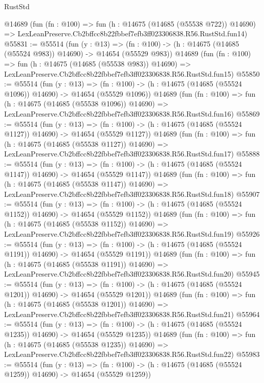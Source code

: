 \begin{lexlean}{RustStd}
\begin{coremodule}
    @14689
    (fun (fn : @100) =>
    fun (h : @14675 (@14685 (@55538 @722)) @14690) =>
    LexLeanPreserve.Cb2bffcc8b22fbbef7efb3ff023306838.R56.RustStd.fun14)
@55831 := @55514
    (fun (y : @13) =>
    (fn : @100) -> (h : @14675 (@14685 (@55524 @983)) @14690) -> @14654 (@55529 @983))
    @14689
    (fun (fn : @100) =>
    fun (h : @14675 (@14685 (@55538 @983)) @14690) =>
    LexLeanPreserve.Cb2bffcc8b22fbbef7efb3ff023306838.R56.RustStd.fun15)
@55850 := @55514
    (fun (y : @13) =>
    (fn : @100) -> (h : @14675 (@14685 (@55524 @1096)) @14690) -> @14654 (@55529 @1096))
    @14689
    (fun (fn : @100) =>
    fun (h : @14675 (@14685 (@55538 @1096)) @14690) =>
    LexLeanPreserve.Cb2bffcc8b22fbbef7efb3ff023306838.R56.RustStd.fun16)
@55869 := @55514
    (fun (y : @13) =>
    (fn : @100) -> (h : @14675 (@14685 (@55524 @1127)) @14690) -> @14654 (@55529 @1127))
    @14689
    (fun (fn : @100) =>
    fun (h : @14675 (@14685 (@55538 @1127)) @14690) =>
    LexLeanPreserve.Cb2bffcc8b22fbbef7efb3ff023306838.R56.RustStd.fun17)
@55888 := @55514
    (fun (y : @13) =>
    (fn : @100) -> (h : @14675 (@14685 (@55524 @1147)) @14690) -> @14654 (@55529 @1147))
    @14689
    (fun (fn : @100) =>
    fun (h : @14675 (@14685 (@55538 @1147)) @14690) =>
    LexLeanPreserve.Cb2bffcc8b22fbbef7efb3ff023306838.R56.RustStd.fun18)
@55907 := @55514
    (fun (y : @13) =>
    (fn : @100) -> (h : @14675 (@14685 (@55524 @1152)) @14690) -> @14654 (@55529 @1152))
    @14689
    (fun (fn : @100) =>
    fun (h : @14675 (@14685 (@55538 @1152)) @14690) =>
    LexLeanPreserve.Cb2bffcc8b22fbbef7efb3ff023306838.R56.RustStd.fun19)
@55926 := @55514
    (fun (y : @13) =>
    (fn : @100) -> (h : @14675 (@14685 (@55524 @1191)) @14690) -> @14654 (@55529 @1191))
    @14689
    (fun (fn : @100) =>
    fun (h : @14675 (@14685 (@55538 @1191)) @14690) =>
    LexLeanPreserve.Cb2bffcc8b22fbbef7efb3ff023306838.R56.RustStd.fun20)
@55945 := @55514
    (fun (y : @13) =>
    (fn : @100) -> (h : @14675 (@14685 (@55524 @1201)) @14690) -> @14654 (@55529 @1201))
    @14689
    (fun (fn : @100) =>
    fun (h : @14675 (@14685 (@55538 @1201)) @14690) =>
    LexLeanPreserve.Cb2bffcc8b22fbbef7efb3ff023306838.R56.RustStd.fun21)
@55964 := @55514
    (fun (y : @13) =>
    (fn : @100) -> (h : @14675 (@14685 (@55524 @1235)) @14690) -> @14654 (@55529 @1235))
    @14689
    (fun (fn : @100) =>
    fun (h : @14675 (@14685 (@55538 @1235)) @14690) =>
    LexLeanPreserve.Cb2bffcc8b22fbbef7efb3ff023306838.R56.RustStd.fun22)
@55983 := @55514
    (fun (y : @13) =>
    (fn : @100) -> (h : @14675 (@14685 (@55524 @1259)) @14690) -> @14654 (@55529 @1259))

\end{coremodule}
\end{lexlean}
